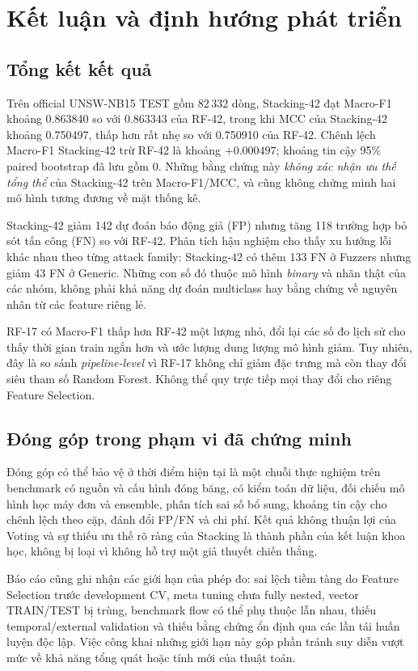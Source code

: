 \section{Kết luận và định hướng phát triển}
\label{chap:ket-luan}

\subsection{Tổng kết kết quả}
Trên official UNSW-NB15 TEST gồm 82\,332 dòng, Stacking-42 đạt Macro-F1 khoảng 0.863840 so với 0.863343 của RF-42, trong khi MCC của Stacking-42 khoảng 0.750497, thấp hơn rất nhẹ so với 0.750910 của RF-42. Chênh lệch Macro-F1 Stacking-42 trừ RF-42 là khoảng $+0.000497$; khoảng tin cậy 95\% paired bootstrap đã lưu gồm 0. Những bằng chứng này \emph{không xác nhận ưu thế tổng thể} của Stacking-42 trên Macro-F1/MCC, và cũng không chứng minh hai mô hình tương đương về mặt thống kê.

Stacking-42 giảm 142 dự đoán báo động giả (FP) nhưng tăng 118 trường hợp bỏ sót tấn công (FN) so với RF-42. Phân tích hậu nghiệm cho thấy xu hướng lỗi khác nhau theo từng attack family: Stacking-42 có thêm 133 FN ở Fuzzers nhưng giảm 43 FN ở Generic. Những con số đó thuộc mô hình \emph{binary} và nhãn thật của các nhóm, không phải khả năng dự đoán multiclass hay bằng chứng về nguyên nhân từ các feature riêng lẻ.

RF-17 có Macro-F1 thấp hơn RF-42 một lượng nhỏ, đổi lại các số đo lịch sử cho thấy thời gian train ngắn hơn và ước lượng dung lượng mô hình giảm. Tuy nhiên, đây là so sánh \emph{pipeline-level} vì RF-17 không chỉ giảm đặc trưng mà còn thay đổi siêu tham số Random Forest. Không thể quy trực tiếp mọi thay đổi cho riêng Feature Selection.

\subsection{Đóng góp trong phạm vi đã chứng minh}
Đóng góp có thể bảo vệ ở thời điểm hiện tại là một chuỗi thực nghiệm trên benchmark có nguồn và cấu hình đóng băng, có kiểm toán dữ liệu, đối chiếu mô hình học máy đơn và ensemble, phân tích sai số bổ sung, khoảng tin cậy cho chênh lệch theo cặp, đánh đổi FP/FN và chi phí. Kết quả không thuận lợi của Voting và sự thiếu ưu thế rõ ràng của Stacking là thành phần của kết luận khoa học, không bị loại vì không hỗ trợ một giả thuyết chiến thắng.

Báo cáo cũng ghi nhận các giới hạn của phép đo: sai lệch tiềm tàng do Feature Selection trước development CV, meta tuning chưa fully nested, vector TRAIN/TEST bị trùng, benchmark flow có thể phụ thuộc lẫn nhau, thiếu temporal/external validation và thiếu bằng chứng ổn định qua các lần tái huấn luyện độc lập. Việc công khai những giới hạn này góp phần tránh suy diễn vượt mức về khả năng tổng quát hoặc tính mới của thuật toán.

